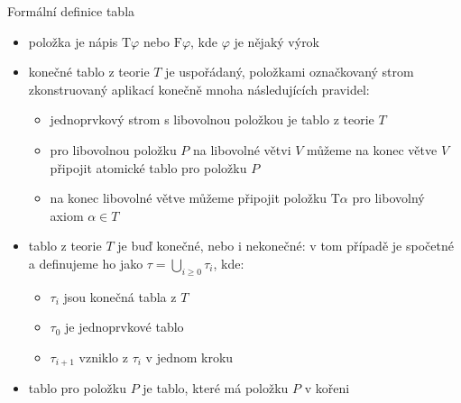 \documentclass{beamer}
\begin{document}
\begin{frame}{Formální definice tabla}

    \begin{itemize}[<+->]
        \item \alert{položka} je nápis $\mathrm{T}\varphi$ nebo $\mathrm{F}\varphi$, kde $\varphi$ je nějaký výrok
        \item \alert{konečné tablo z teorie $T$} je uspořádaný, položkami označkovaný strom zkonstruovaný aplikací konečně mnoha následujících pravidel:
        \begin{itemize}[<+->]
            \item jednoprvkový strom s libovolnou položkou je tablo z teorie $T$
            \item pro libovolnou položku $P$ na libovolné větvi $V$ můžeme na konec větve $V$ připojit atomické tablo pro položku $P$
            \item na konec libovolné větve můžeme připojit položku $\mathrm{T}\alpha$ pro libovolný axiom $\alpha\in T$
        \end{itemize}
        \item \alert{tablo z teorie $T$} je buď konečné, nebo i nekonečné: v tom případě je spočetné a definujeme ho jako $\tau=\bigcup_{i\geq 0}\tau_i$, kde:
        \begin{itemize}[<+->]
            \item $\tau_i$ jsou konečná tabla z $T$
            \item $\tau_0$ je jednoprvkové tablo
            \item $\tau_{i+1}$ vzniklo z $\tau_i$ v jednom kroku
        \end{itemize}
        \item \alert{tablo pro položku $P$} je tablo, které má položku $P$ v kořeni
    \end{itemize}

\end{frame}
\end{document}
